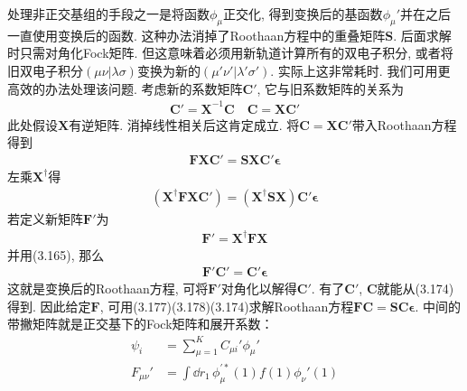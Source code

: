 处理非正交基组的手段之一是将函数${\phi_\mu}$正交化, 
得到变换后的基函数$\phi_\mu'$并在之后一直使用变换后的函数. 
这种办法消掉了Roothaan方程中的重叠矩阵$\mathbf{S}$. 
后面求解时只需对角化Fock矩阵. 
但这意味着必须用新轨道计算所有的双电子积分, 
或者将旧双电子积分$(\mu\nu|\lambda\sigma)$变换为新的$(\mu'\nu'|\lambda'\sigma')$. 
实际上这非常耗时. 
我们可用更高效的办法处理该问题. 
考虑新的系数矩阵$\mathbf{C}'$, 
它与旧系数矩阵的关系为
\begin{align}
	\mathbf{C'=X}^{-1}\mathbf{C}\quad \mathbf{C=XC'}
\end{align}
此处假设$\mathbf{X}$有逆矩阵. 
消掉线性相关后这肯定成立. 
将$\mathbf{C=XC'}$带入Roothaan方程得到
\begin{align}
	\mathbf{FXC'=SXC'}\bm{\epsilon}
\end{align} 
左乘$\mathbf{X^\dagger}$得
\begin{align}
	(\mathbf{X^\dagger FX}\mathbf{C'}) = (\mathbf{X^\dagger SX})\mathbf{C'}\bm{\epsilon}
\end{align}
若定义新矩阵$\mathbf{F}'$为
\begin{align}
	\mathbf{F'=X^\dagger FX}
\end{align}
并用(3.165), 
那么
\begin{align}
	\mathbf{F'C'=C'}\bm{\epsilon}
\end{align}
这就是变换后的Roothaan方程, 
可将$\mathbf{F'}$对角化以解得$\mathbf{C'}$. 
有了$\mathbf{C'}$, 
$\mathbf{C}$就能从(3.174)得到. 
因此给定$\mathbf{F}$, 
可用(3.177)(3.178)(3.174)求解Roothaan方程$\mathbf{FC=SC}\bm{\epsilon}$. 
中间的带撇矩阵就是正交基下的Fock矩阵和展开系数：
\begin{align}
	\psi_i & = \sum_{\mu=1}^{K}C_{\mu i}'\phi_\mu'\\
	F_{\mu\nu}' & = \int\dd{r}_1\,\phi^{\prime*}_\mu(1)f(1)\phi_\nu'(1)
\end{align}

